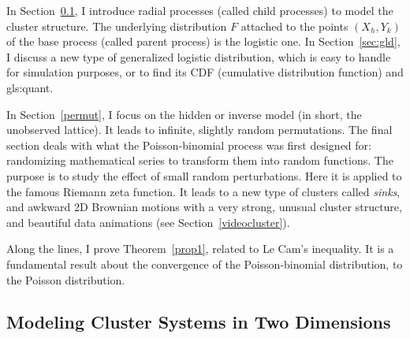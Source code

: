\documentclass[10pt]{article}
\begin{document}
In  Section~\ref{s:clp}, I introduce \textcolor{index}{radial processes} (called 
\textcolor{index}{child processes}) to model the cluster structure. The underlying distribution $F$
attached to the points $(X_h,Y_k)$ of the base process (called \textcolor{index}{parent process})
is the logistic one. In Section~\ref{sec:gld}, I discuss a new type of 
\textcolor{index}{generalized logistic distribution}, which is easy to handle for simulation purposes, or to find 
its CDF (cumulative distribution function) and \gls{gls:quant}. 

In Section~\ref{permut}, I focus on the hidden or \textcolor{index}{inverse model} (in short, the unobserved lattice). It leads to infinite,
slightly \textcolor{index}{random permutations}. The final section deals with what the Poisson-binomial process 
was first designed for: randomizing mathematical series to transform them into 
\textcolor{index}{random functions}. The purpose is to study the effect of small random perturbations. Here it is applied to the famous \textcolor{index}{Riemann zeta function}. It leads to a new type of clusters called {\em sinks}, and awkward 2D Brownian motions with a very strong, unusual cluster structure, and beautiful data animations (see Section~\ref{videocluster}).   

Along the lines, I prove Theorem~\ref{prop1}, related to 
\textcolor{index}{Le Cam's inequality}. It is a fundamental result about the convergence of the
\textcolor{index}{Poisson-binomial distribution}, to the Poisson distribution. 

 

\subsection{Modeling Cluster Systems in Two Dimensions}\label{s:clp}
\end{document}
